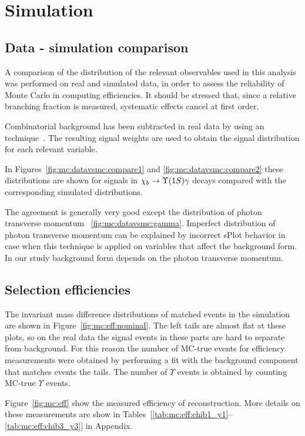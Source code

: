 \section{Simulation}
\label{sec:mc}

\subsection{Data - simulation comparison}
\label{sec:mc:datavsmc}

A comparison of the distribution of the relevant observables used in this
analysis was performed on real and simulated data, in order to assess the
reliability of Monte Carlo in computing efficiencies. It should be stressed
that, since a relative branching fraction is measured, systematic effects cancel
at first order.

Combinatorial background has been subtracted in real data by using an
\sPlot  technique~\cite{Pivk:2004ty}.
The resulting signal weights are used to obtain the signal distribution for each
relevant variable. 


In Figures~\ref{fig:mc:datavsmc:compare1} and \ref{fig:mc:datavsmc:compare2}
these distributions  are shown for signals in $\chib \to \Y1S \gamma$ decays
compared with the corresponding simulated distributions.




The agreement is generally very good except the distribution of photon
transverse momentum ~\ref{fig:mc:datavsmc:gamma}. Imperfect  distribution of
photon transverse momentum can be explained by incorrect sPlot behavior in case
when this technique is applied on variables that affect the background form. In
our study background form depends on the photon transverse momentum.

\subsection{Selection efficiencies}
\label{sec:mc:eff}

The invariant mass difference distributions of matched events in the \chib
simulation are shown in Figure~\ref{fig:mc:eff:nominal}. The left tails are
almost flat at these plots, so on the real data the signal events in these parts
are hard to separate from background. For this reason the number of MC-true
\chib events for efficiency measurements were obtained by performing a fit with
the background component that matches events the tails. The number of $\Upsilon$
events is obtained by counting MC-true $\Upsilon$ events.



Figure~\ref{fig:mc:eff} show the measured efficiency of \chib reconstruction.
More details on these measurements are show in
Tables~[\ref{tab:mc:eff:chib1_y1}--\ref{tab:mc:eff:chib3_y3}] in Appendix.


